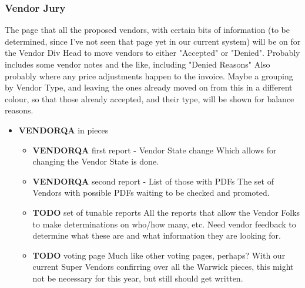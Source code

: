 \documentclass[captions=tablesignature]{scrartcl}
\begin{document}
\subsubsection{Vendor Jury}
\label{sec-3-1-11}
The page that all the proposed vendors, with certain bits of
information (to be determined, since I've not seen that page yet
in our current system) will be on for the Vendor Div Head to move
vendors to either "Accepted" or "Denied".  Probably includes some
vendor notes and the like, including "Denied Reasons" Also
probably where any price adjustments happen to the invoice.  Maybe
a grouping by Vendor Type, and leaving the ones already moved on
from this in a different colour, so that those already accepted,
and their type, will be shown for balance reasons.
\begin{itemize}
\item {\bfseries\sffamily VENDORQA} in pieces
\label{sec-3-1-11-1}
\begin{itemize}
\item {\bfseries\sffamily VENDORQA} first report - Vendor State change
\label{sec-3-1-11-1-1}
Which allows for changing the Vendor State is done.

\item {\bfseries\sffamily VENDORQA} second report - List of those with PDFs
\label{sec-3-1-11-1-2}
The set of Vendors with possible PDFs waiting to be checked and
promoted.

\item {\bfseries\sffamily TODO} set of tunable reports
\label{sec-3-1-11-1-3}
All the reports that allow the Vendor Folks to make
determinations on who/how many, etc.  Need vendor feedback to
determine what these are and what information they are looking
for.

\item {\bfseries\sffamily TODO} voting page
\label{sec-3-1-11-1-4}
Much like other voting pages, perhaps?  With our current Super
Vendors confirring over all the Warwick pieces, this might not
be necessary for this year, but still should get written.
\end{itemize}
\end{itemize}
\end{document}

